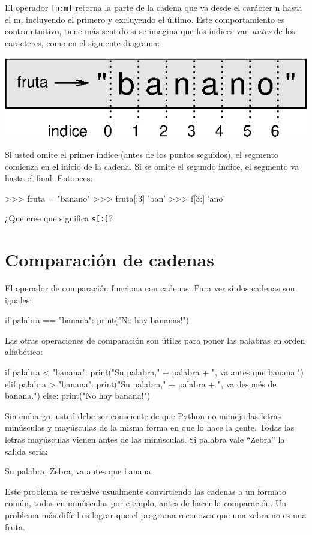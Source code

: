 El operador \texttt{{[}n:m{]}} retorna la parte de la cadena que va
desde el carácter n hasta el m, incluyendo el primero y excluyendo
el último. Este comportamiento es contraintuitivo, tiene más sentido
si se imagina que los índices van {\em antes} de los caracteres,
como en el siguiente diagrama:

\beforefig \centerline{\includegraphics{illustrations/banana}}
\afterfig

Si usted omite el primer índice (antes de los puntos seguidos), el
segmento comienza en el inicio de la cadena. Si se omite el segundo
índice, el segmento va hasta el final. Entonces:
\begin{pyconcode}
>>> fruta  = "banano"
>>> fruta[:3]
'ban'
>>> f[3:]
'ano'
\end{pyconcode}
 ¿Que cree que significa \texttt{s{[}:{]}}?

\section{Comparación de cadenas}

 

El operador de comparación funciona con cadenas. Para ver si dos cadenas
son iguales:
\begin{pythoncode}
if palabra == "banana":
  print("No hay bananas!")
\end{pythoncode}
Las otras operaciones de comparación son útiles para poner las palabras
en orden alfabético:
\begin{pythoncode}
if palabra < "banana":
  print("Su palabra," + palabra + ", va antes que banana.")
elif palabra > "banana":
  print("Su palabra," + palabra + ", va después de banana.")
else:
  print("No hay banana!")
\end{pythoncode}

Sin embargo, usted debe ser consciente de que Python no maneja las
letras minúsculas y mayúsculas de la misma forma en que lo hace la
gente. Todas las letras mayúsculas vienen antes de las minúsculas.
Si palabra vale ``Zebra'' la salida sería:
\begin{pythoncode}
Su palabra, Zebra, va antes que banana.
\end{pythoncode}
Este problema se resuelve usualmente convirtiendo las cadenas a un
formato común, todas en minúsculas por ejemplo, antes de hacer la
comparación. Un problema más difícil es lograr que el programa reconozca
que una zebra no es una fruta.

